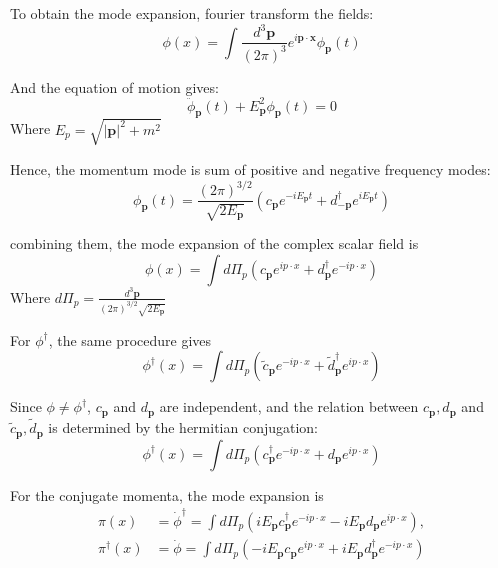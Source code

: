 \documentclass[a4paper,11pt]{article}
\begin{document}
To obtain the mode expansion, fourier transform the fields:
\begin{equation}
    \phi(x) = \int \frac{d^3\mathbf{p}}{(2\pi)^3} e^{i\mathbf{p}\cdot\mathbf{x}} \phi_{\mathbf{p}}(t)
\end{equation}

And the equation of motion gives:
\begin{equation}
    \ddot{\phi}_{\mathbf{p}}(t) + E_{\mathbf{p}}^2\phi_{\mathbf{p}}(t) = 0
\end{equation}
Where $E_p = \sqrt{|\mathbf{p}|^2 + m^2}$

Hence, the momentum mode is sum of positive and negative frequency modes:
\begin{equation}
    \phi_{\mathbf{p}}(t) = \frac{(2\pi)^{3/2}}{\sqrt{2E_{\mathbf{p}}}}\left(c_{\mathbf{p}}e^{-iE_{\mathbf{p}}t} + d_{-\mathbf{p}}^\dagger e^{iE_{\mathbf{p}}t}\right)
\end{equation}

combining them, the mode expansion of the complex scalar field is
\begin{equation}
    \phi(x) = \int d\Pi_p\left(c_{\mathbf{p}}e^{ip\cdot x} + d_{\mathbf{p}}^\dagger e^{-ip\cdot x}\right)
\end{equation}
Where $d\Pi_p = \frac{d^3\mathbf{p}}{(2\pi)^{3/2}\sqrt{2E_{\mathbf{p}}}}$

For $\phi^\dagger$, the same procedure gives
\begin{equation}
    \phi^\dagger(x) = \int d\Pi_p\left(\tilde{c}_{\mathbf{p}} e^{-ip\cdot x} + \tilde{d}_{\mathbf{p}}^\dagger e^{ip\cdot x}\right)
\end{equation}

Since $\phi\ne\phi^\dagger$, $c_{\mathbf{p}}$ and $d_{\mathbf{p}}$ are independent, and the relation between $c_{\mathbf{p}}, d_{\mathbf{p}}$ and $\tilde{c}_{\mathbf{p}}, \tilde{d}_{\mathbf{p}}$ is determined by the hermitian conjugation:
\begin{equation}
    \phi^\dagger(x) = \int d\Pi_p\left(c_{\mathbf{p}}^\dagger e^{-ip\cdot x} + d_{\mathbf{p}} e^{ip\cdot x}\right)
\end{equation}

For the conjugate momenta, the mode expansion is
\begin{align}
    \pi(x) &= \dot{\phi}^\dagger = \int d\Pi_p\left(iE_{\mathbf{p}}c_{\mathbf{p}}^\dagger e^{-ip\cdot x} - iE_{\mathbf{p}}d_{\mathbf{p}} e^{ip\cdot x}\right), \\
    \pi^\dagger(x) &= \dot{\phi} = \int d\Pi_p\left(-iE_{\mathbf{p}}c_{\mathbf{p}}e^{ip\cdot x} + iE_{\mathbf{p}}d_{\mathbf{p}}^\dagger e^{-ip\cdot x}\right)
\end{align}
\end{document}
